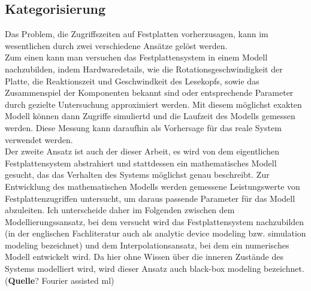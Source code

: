 \documentclass[
	12pt,
	a4paper,
	BCOR10mm,
	DIV14,
	listof=totoc,
	bibliography=totoc,
	headsepline
]{scrreprt}
\begin{document}
\subsection{Kategorisierung}
	Das Problem, die Zugriffszeiten auf Festplatten vorherzusagen, kann im wesentlichen durch zwei verschiedene Ansätze gelöst werden.\\ Zum einen kann man versuchen das Festplattensystem in einem Modell nachzubilden, indem Hardwaredetails, wie die Rotationsgeschwindigkeit der Platte, die Reaktionszeit und Geschwindkeit des Lesekopfs, sowie das Zusammenspiel der Komponenten bekannt sind oder entsprechende Parameter durch gezielte Untersuchung approximiert werden. Mit diesem möglichst exakten Modell können dann Zugriffe simuliertd und die Laufzeit des Modells gemessen werden. Diese Messung kann daraufhin als Vorhersage für das reale System verwendet werden.\\
Der zweite Ansatz ist auch der dieser Arbeit, es wird von dem eigentlichen Festplattensystem abstrahiert und stattdessen ein mathematisches Modell gesucht,
das das Verhalten des Systems möglichst genau beschreibt. Zur Entwicklung des mathematischen Modells werden gemessene Leistungswerte von Festplattenzugriffen untersucht, um daraus passende Parameter für das Modell abzuleiten. Ich unterscheide daher im Folgenden zwischen dem Modellierungssansatz, bei dem versucht wird das Festplattensystem nachzubilden (in der englischen Fachliteratur auch als analytic device modeling bzw. simulation modeling bezeichnet) und dem Interpolationsansatz, bei dem ein numerisches Modell entwickelt wird. Da hier ohne Wissen über die inneren Zustände des Systems modelliert wird, wird dieser Ansatz auch black-box modeling bezeichnet. (\textbf{Quelle}? Fourier assisted ml)
	
\end{document}
